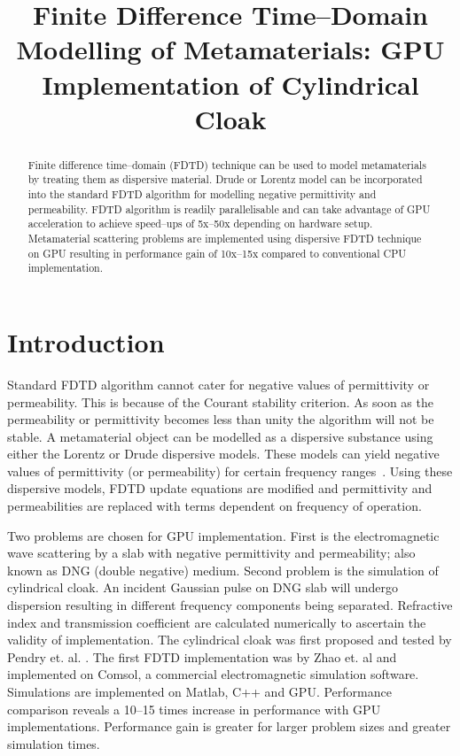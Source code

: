 \documentclass{article}
\title{Finite Difference Time--Domain Modelling of Metamaterials: GPU Implementation of Cylindrical Cloak} %
\begin{document}
\maketitle

%
\begin{abstract}
Finite difference time--domain (FDTD) technique can be used to model metamaterials by treating them as dispersive material. Drude or Lorentz model can be incorporated into the standard FDTD algorithm for modelling negative permittivity and permeability. FDTD algorithm is readily parallelisable and can take advantage of GPU acceleration to achieve speed--ups of 5x--50x depending on hardware setup. Metamaterial scattering problems are implemented using dispersive FDTD technique on GPU resulting in performance gain of 10x--15x compared to conventional CPU implementation.
\end{abstract}

%
\section{Introduction}

Standard FDTD algorithm cannot cater for negative values of permittivity or permeability. This is because of the Courant stability criterion. As soon as the permeability or permittivity becomes less than unity the algorithm will not be stable. A metamaterial object can be modelled as a dispersive substance using either the Lorentz or Drude dispersive models. These models can yield negative values of permittivity (or permeability) for certain frequency ranges~\cite{NumericalFDTD-Sibel}. Using these dispersive models, FDTD update equations are modified and permittivity and permeabilities are replaced with terms dependent on frequency of operation.

Two problems are chosen for GPU implementation. First is the electromagnetic wave scattering by a slab with negative permittivity and permeability; also known as DNG (double negative) medium. Second problem is the simulation of cylindrical cloak. An incident Gaussian pulse on DNG slab will undergo dispersion resulting in different frequency components being separated. Refractive index and transmission coefficient are calculated numerically to ascertain the validity of implementation. The cylindrical cloak was first proposed and tested by Pendry et. al. \cite{PendryShurig-MicrowaveCloak}. The first FDTD implementation was by Zhao et. al \cite{Radial-Zhao} and implemented on Comsol, a commercial electromagnetic simulation software. Simulations are implemented on Matlab, C++ and GPU. Performance comparison reveals a 10--15 times increase in performance with GPU implementations. Performance gain is greater for larger problem sizes and greater simulation times.
\end{document}
